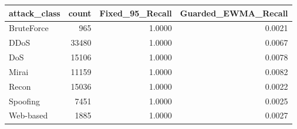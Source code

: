 \begin{tabular}{lrrr}
\toprule
attack_class & count & Fixed_95_Recall & Guarded_EWMA_Recall \\
\midrule
BruteForce & 965 & 1.0000 & 0.0021 \\
DDoS & 33480 & 1.0000 & 0.0067 \\
DoS & 15106 & 1.0000 & 0.0078 \\
Mirai & 11159 & 1.0000 & 0.0082 \\
Recon & 15036 & 1.0000 & 0.0022 \\
Spoofing & 7451 & 1.0000 & 0.0025 \\
Web-based & 1885 & 1.0000 & 0.0027 \\
\bottomrule
\end{tabular}
